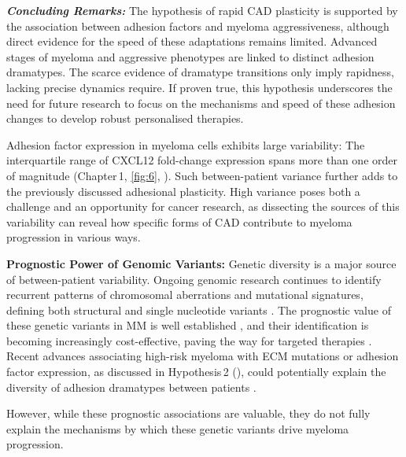 \textbf{\textit{Concluding Remarks:}} The hypothesis of rapid \ac{CAD}
plasticity is supported by the association between adhesion factors and myeloma
aggressiveness, although direct evidence for the speed of these adaptations
remains limited. Advanced stages of myeloma and aggressive phenotypes are linked
to distinct adhesion dramatypes. The scarce evidence of dramatype transitions
only imply rapidness, lacking precise dynamics require. If proven true, this
hypothesis underscores the need for future research to focus on the mechanisms
and speed of these adhesion changes to develop robust personalised therapies.




\unnsubsection{\cadddiversitytitle}%
\label{sec:discussion_cadddiversity}%
Adhesion factor expression in myeloma cells exhibits large variability: The
interquartile range of CXCL12 fold-change expression spans more than one order
of magnitude (Chapter\,1, \autoref{fig:6}, ). Such
between-patient variance further adds to the previously discussed adhesional
plasticity. High
variance poses both a challenge and an opportunity for cancer research, as
dissecting the sources of this variability can reveal how specific forms
of \ac{CAD} contribute to myeloma progression in various ways.


\textbf{Prognostic Power of Genomic Variants:}
Genetic diversity is a major source of between-patient variability. Ongoing
genomic research continues to identify recurrent patterns of chromosomal
aberrations and mutational signatures, defining both structural and single
nucleotide variants \cite{kumarMultipleMyelomasCurrent2018a,
      hoangMutationalProcessesContributing2019}. The prognostic value of these genetic
variants in MM is well established \cite{sharmaPrognosticRoleMYC2021}, and their
identification is becoming increasingly cost-effective, paving the way for
targeted therapies \cite{zouComprehensiveApproachEvaluate2024,
      budurleanIntegratingOpticalGenome2024}. Recent advances associating high-risk
myeloma with \ac{ECM} mutations or adhesion factor expression, as discussed in
Hypothesis\,2 (), could potentially
explain the diversity of adhesion dramatypes between patients
\cite{eversPrognosticValueExtracellular2023,
      huDevelopmentCellAdhesionbased2024}.

However, while these prognostic associations are valuable, they do not fully
explain the mechanisms by which these genetic variants drive myeloma
progression.



